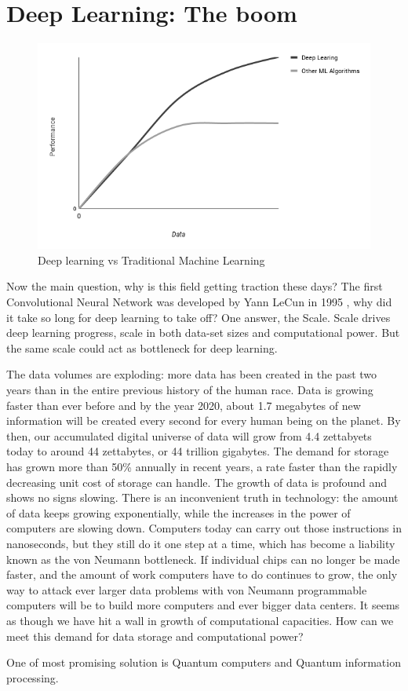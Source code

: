 \section{Deep Learning: The boom}
\begin{figure}[H]
\centering\includegraphics[width=.6\textwidth]{images/chart.png}
\caption{Deep learning vs Traditional Machine Learning}
\end{figure}
Now the main question, why is this field getting traction these days? The first Convolutional Neural Network was developed by Yann LeCun in 1995 \cite{lecun}, why did it take so long for deep learning to take off? One answer, the Scale. Scale drives deep learning progress, scale in both data-set sizes and computational power. But the same scale could act as bottleneck for deep learning.\par\bigskip
The data volumes are exploding: more data has been created in the past two years than in the entire previous history of the human race. Data is growing faster than ever before and by the year 2020, about 1.7 megabytes of new information will be created every second for every human being on the planet. By then, our accumulated digital universe of data will grow from 4.4 zettabyets today to around 44 zettabytes, or 44 trillion gigabytes. The demand for storage has grown more than 50\% annually in recent years, a rate faster than the rapidly decreasing unit cost of storage can handle. The growth of data is profound and shows no signs slowing. There is an inconvenient truth in technology: the amount of data keeps growing exponentially, while the increases in the power of computers are slowing down. Computers today can carry out those instructions in nanoseconds, but they still do it one step at a time, which has become a liability known as the von Neumann bottleneck. If individual chips can no longer be made faster, and the amount of work computers have to do continues to grow, the only way to attack ever larger data problems with von Neumann programmable computers will be to build more computers and ever bigger data centers. It seems as though we have hit a wall in growth of computational capacities. How can we meet this demand for data storage and computational power? \par\bigskip
One of most promising solution is Quantum computers and Quantum information processing.
